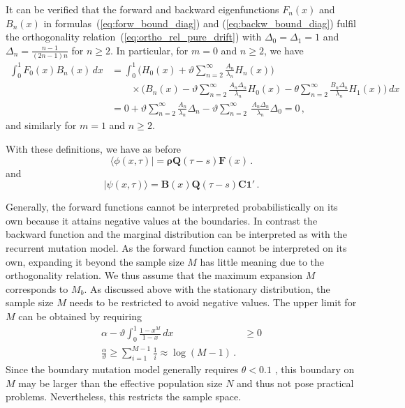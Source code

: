 \documentclass[preprint]{elsarticle}
\newcommand{\bs}[1]{\ensuremath{\boldsymbol{#1}}}
\newcommand\oneC{\ensuremath{\mathbf{1}'}}
\begin{document}
It can be verified that the forward and backward eigenfunctions $F_n(x)$ and $B_n(x)$ in formulas~(\ref{eq:forw_bound_diag}) and (\ref{eq:backw_bound_diag}) fulfil the orthogonality relation~(\ref{eq:ortho_rel_pure_drift}) with $\Delta_0=\Delta_1=1$ and $\Delta_n=\frac{n-1}{(2n-1)n}$ for $n\geq 2$. 
In particular, for $m=0$ and $n\geq 2$, we have
\begin{equation}
\begin{split}
    \int_0^1 F_0(x)B_n(x)\,dx&=\int_0^1 \bigg(H_0(x)+\vartheta \sum_{n=2}^\infty\frac{A_n}{\lambda_n} H_n(x)\bigg)\\
    &\qquad \times \bigg(B_n(x)-\vartheta \sum_{n=2}^\infty\frac{A_n\Delta_n}{\lambda_n} H_0(x)-\theta \sum_{n=2}^\infty\frac{B_n\Delta_n}{\lambda_n} H_1(x)\bigg)\,dx\\
    &=0+\vartheta \sum_{n=2}^\infty\frac{A_n}{\lambda_n} \Delta_n-\vartheta \sum_{n=2}^\infty\ \frac{A_n\Delta_n}{\lambda_n} \Delta_0=0\,,
\end{split}
\end{equation}
and similarly for $m=1$ and $n\geq 2$. 

With these definitions, we have as before
\begin{equation}
\langle\phi(x,\tau)|=\bs{\rho}\mathbf{Q}(\tau-s)\mathbf{F}(x)\,.
\end{equation}
and
\begin{equation}\label{eq:backw_bound_drift_mat}
|\psi(x,\tau)\rangle=\mathbf{B}(x)\mathbf{Q}(\tau-s)\mathbf{C}\oneC\,.
\end{equation}

Generally, the forward functions cannot be interpreted probabilistically on its own because it attains negative values at the boundaries. In contrast the backward function and the marginal distribution can be interpreted as with the recurrent mutation model. As the forward function cannot be interpreted on its own, expanding it beyond the sample size $M$ has little meaning due to the orthogonality relation. We thus assume that the maximum expansion $M$ corresponds to $M_b$. As discussed above with the stationary distribution, the sample size $M$ needs to be restricted to avoid negative values. The upper limit for $M$ can be obtained by requiring
\begin{equation}
\begin{split}
    \alpha-\vartheta\int_0^1 \frac{1-x^{M}}{1-x}\,dx&\geq 0\\
    \frac{\alpha}{\vartheta}\geq\sum_{i=1}^{M-1} \frac1{i}\approx \log(M-1)\,.
\end{split}
\end{equation}
Since the boundary mutation model generally requires $\theta<0.1$ \citep{Vogl15}, this boundary on $M$ may be larger than the effective population size $N$ and thus not pose practical problems. Nevertheless, this restricts the sample space.
\end{document}
